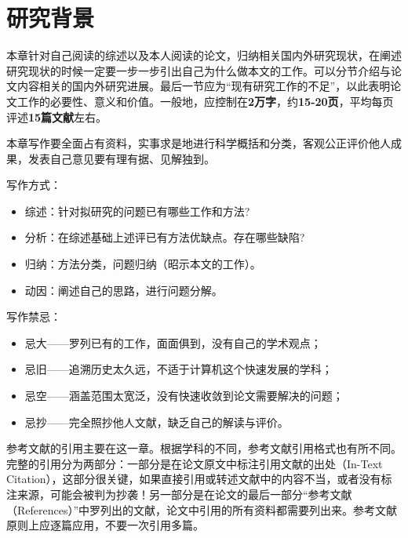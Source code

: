 \chapter{研究背景}

本章针对自己阅读的综述以及本人阅读的论文，归纳相关国内外研究现状，在阐述研究现状的时候一定要一步一步引出自己为什么做本文的工作。可以分节介绍与论文内容相关的国内外研究进展。最后一节应为“现有研究工作的不足”，以此表明论文工作的必要性、意义和价值。一般地，应控制在\textbf{2万字}，约\textbf{15-20页}，平均每页评述\textbf{15篇文献}左右。

本章写作要全面占有资料，实事求是地进行科学概括和分类，客观公正评价他人成果，发表自己意见要有理有据、见解独到。

写作方式：
\begin{itemize}
    \item 综述：针对拟研究的问题已有哪些工作和方法?
    \item 分析：在综述基础上述评已有方法优缺点。存在哪些缺陷?
    \item 归纳：方法分类，问题归纳（昭示本文的工作）。
    \item 动因：阐述自己的思路，进行问题分解。
\end{itemize}

写作禁忌：
\begin{itemize}
    \item 忌大——罗列已有的工作，面面俱到，没有自己的学术观点；
    \item 忌旧——追溯历史太久远，不适于计算机这个快速发展的学科；
    \item 忌空——涵盖范围太宽泛，没有快速收敛到论文需要解决的问题；
    \item 忌抄——完全照抄他人文献，缺乏自己的解读与评价。
\end{itemize}

参考文献的引用主要在这一章。根据学科的不同，参考文献引用格式也有所不同。完整的引用分为两部分：一部分是在论文原文中标注引用文献的出处（In-Text Citation），这部分很关键，如果直接引用或转述文献中的内容不当，或者没有标注来源，可能会被判为抄袭！另一部分是在论文的最后一部分“参考文献（References）”中罗列出的文献，论文中引用的所有资料都需要列出来。参考文献原则上应逐篇应用，不要一次引用多篇。

